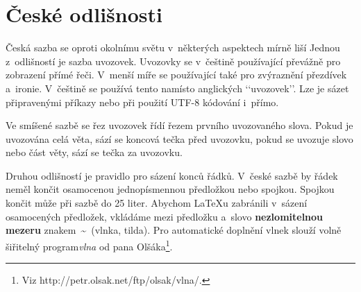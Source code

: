 \documentclass[twocolumn, 11pt, a4paper]{article}
\begin{document}
\section{České odlišnosti}
Česká sazba se oproti okolnímu světu v~některých aspektech mírně liší Jednou z~odlišností je sazba uvozovek. Uvozovky se v~češtině používající převážně pro zobrazení přímé řeči. V~menší míře se používající také pro zvýraznění přezdívek a~ironie. V~češtině se používá tento \textbf{} namísto anglických ‘‘uvozovek’’. Lze je sázet připravenými příkazy nebo při použití UTF-8 kódování i~přímo.

Ve smíšené sazbě se řez uvozovek ří­dí­ řezem prvního uvozovaného slova. Pokud je uvozována celá věta, sází se koncová tečka před uvozovku, pokud se uvozuje slovo nebo část věty, sází se tečka za uvozovku.

Druhou odlišností je pravidlo pro sázení konců řádků. V~české sazbě by řádek neměl končit osamocenou jednopísmennou předložkou nebo spojkou. Spojkou  končit může při sazbě do 25 liter. Abychom \LaTeX u zabránili v~sázení osamocených předložek, vkládáme mezi předložku a~slovo \textbf{nezlomitelnou mezeru} znakem~\textasciitilde~(vlnka, tilda). Pro automatické doplnění vlnek slouží volně šiřitelný program\hspace{2mm}\textsl{vlna} od pana Olšáka\footnote{Viz http://petr.olsak.net/ftp/olsak/vlna/.}.
\end{document}
